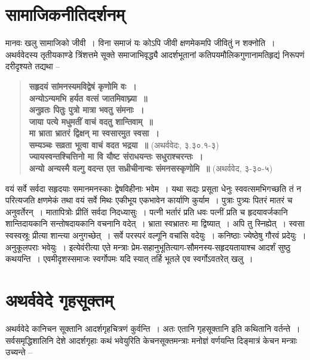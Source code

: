 \section{सामाजिकनीतिदर्शनम्}

मानवः खलु सामाजिको जीवी~। विना समाजं यः कोऽपि जीवी क्षणमेकमपि जीवितुं न शक्नोति~। अथर्ववेदस्य तृतीयकाण्डे त्रिंशत्तमे सूक्ते समाजाभिवृद्ध्यै आदर्शभूतानां कतिपयमौलिकगुणानामतिहृद्यं निरूपणं दरीदृश्यते तद्यथा –

\begin{verse}
\textbf{सहृदयं सांमनस्यमविद्वेषं कृणोमि वः~।}\\
\textbf{अन्योऽन्यमभि हर्यत वत्सं जातमिवाघ्न्या~॥}\\
\textbf{अनुव्रतः पितुः पुत्रो मात्रा भवतु संमनाः~।}\\
\textbf{जाया पत्ये मधुमतीं वाचं वदतु शान्तिवाम्~॥}\\
\textbf{मा भ्राता भ्रातरं द्विक्षन् मा स्वसारमुत स्वसा~।}\\
\textbf{सम्यञ्चः सव्रता भूत्वा वाचं वदत भद्रया~॥} (अथर्ववेदः, ३.३०.१-३)\\
\textbf{ज्यायस्वन्तश्चित्तिनो मा वि यौष्ट संराधयन्तः सधुराश्चरन्तः~।}\\
\textbf{अन्यो अन्यस्मै वल्गु वदन्त एत सध्रीचीनान्वः संमनसस्कृणोमि~॥} (अथर्ववेद, ३-३०-५)
\end{verse}

वयं सर्वे सर्वदा सहृदयाः समानमनस्काः द्वेषविहीनाः भवेम~। यथा सद्यः प्रसूता धेनुः स्ववत्समभिगच्छति तं न परित्यजति क्षणमेकं तथा वयं सर्वे मिथः एकीभूय एकभावेन कार्याणि कुर्याम~। पुत्राः पुत्र्यः पितरं मातरं च अनुवर्तेरन्~। मातापित्रोः प्रीतिं सर्वदा निदध्यासुः~। पत्नी भर्तारं प्रति धवः पत्नीं प्रति च हृदयावर्जकानि शान्तिदायकानि सन्तोषदायकानि वचनानि वदेत्~। भ्राता स्वभ्रातरः मा द्विष्यात्~। अपि तु स्निह्येत्~। स्वसा स्वस्वस्रूः प्रीत्या शान्त्या अनुगच्छेत्~। सर्वे परस्परं वल्गूनि वचांसि वदेयुः~। कनिष्ठाः ज्येष्ठेषु गौरवं प्रदेयुः~। अनुकूलपराः भवेयुः~। इत्येवंरीत्या एते मन्त्राः प्रेम-सहानुभूतित्याग-सौमनस्य-सहृदयतायाश्च आदर्शं सुष्ठु कथयन्ति~। एवमीदृशस्समाजः स्वर्गोपमः यदि स्यात् तर्हि भूतले एव स्वर्गोऽवतरेत् खलु~।


\section*{अथर्ववेदे गृहसूक्तम्}

अथर्ववेदे कानिचन सूक्तानि आदर्शगृहचित्रणं कुर्वन्ति~। अतः एतानि गृहसूक्तानि इति कथितानि वर्तन्ते~। सर्वसमृद्धिशालिनि देशे आदर्शगृहाः कथं भवेयुरिति केचनसूक्तमन्त्राः मनोज्ञं वर्णयन्ति दिङ्मात्रं केचन मन्त्राः उच्यन्ते –

